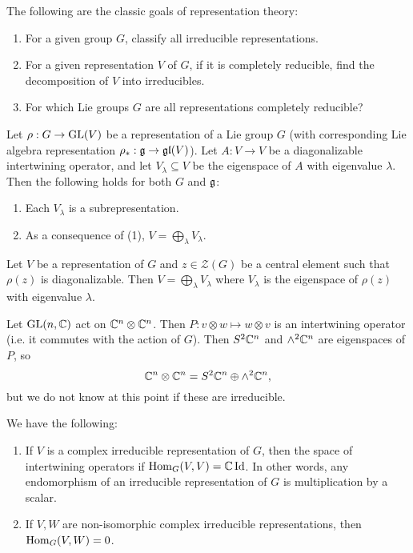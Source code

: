 \begin{remark}
  The following are the classic goals
  of representation theory:
  \begin{enumerate}
    \item For a given group $G$, classify
      all irreducible representations.
    \item For a given representation $V$
      of $G$, if it is completely reducible,
      find the decomposition of $V$ into
      irreducibles.
    \item For which Lie groups $G$ are
      all representations completely
      reducible?
  \end{enumerate}
\end{remark}

\begin{lemma}
  Let $\rho : G \to \operatorname{GL}(V)$ be a
  representation of a Lie group $G$
  (with corresponding Lie algebra
  representation $\rho_* : \mathfrak{g} \to \mathfrak{gl}(V)$).
  Let $A : V \to V$ be a diagonalizable
  intertwining operator, and let
  $V_\lambda \subseteq V$ be the eigenspace
  of $A$ with eigenvalue $\lambda$. Then
  the following holds for both $G$ and $\mathfrak{g}$:
  \begin{enumerate}
    \item Each $V_\lambda$ is a
      subrepresentation.
    \item As a consequence of (1),
      $V = \bigoplus_\lambda V_\lambda$.
  \end{enumerate}
\end{lemma}

\begin{lemma}
  Let $V$ be a representation of $G$ and
  $z \in \mathcal{Z}(G)$ be a
  central element such that
  $\rho(z)$ is diagonalizable. Then
  $V = \bigoplus_\lambda V_\lambda$
  where $V_\lambda$ is the eigenspace of
  $\rho(z)$ with eigenvalue $\lambda$.
\end{lemma}

\begin{example}
  Let $\operatorname{GL}(n, \mathbb{C})$ act on $\mathbb{C}^n \otimes \mathbb{C}^n$.
  Then $P : v \otimes w \mapsto w \otimes v$
  is an intertwining operator (i.e. it
  commutes with the action of $G$).
  Then $S^2 \mathbb{C}^n$ and $\wedge^2 \mathbb{C}^n$
  are eigenspaces of $P$, so
  \[
    \mathbb{C}^n \otimes \mathbb{C}^n =
    S^2 \mathbb{C}^n \oplus \wedge^2 \mathbb{C}^n,
  \]
  but we do not know at this point if
  these are irreducible.
\end{example}

\begin{lemma}
  We have the following:
  \begin{enumerate}
    \item If $V$ is a complex irreducible
      representation of $G$, then the
      space of intertwining operators if
      $\operatorname{Hom}_G(V, V) = \mathbb{C} \operatorname{Id}$.
      In other words, any endomorphism of
      an irreducible representation of $G$
      is multiplication by a scalar.
    \item If $V, W$ are non-isomorphic
      complex irreducible representations,
      then $\operatorname{Hom}_G(V, W) = 0$.
  \end{enumerate}
\end{lemma}

